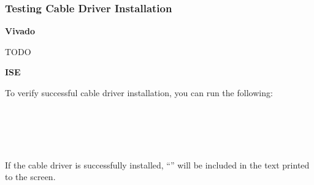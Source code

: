 \subsubsection{Testing Cable Driver Installation}
\textbf{Vivado}
\begin{flushleft}
TODO
\end{flushleft}
\textbf{ISE}
\begin{flushleft}
To verify successful cable driver installation, you can run the following:\\
 \\
 \\
 \\
 \\
 \\
If the cable driver is successfully installed, ``'' will be included in the text printed to the screen.
%
%
%
%
%
\end{flushleft}
\pagebreak


